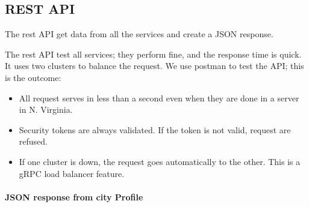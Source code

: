 \subsection{REST API}
\vskip 0.1in
\indent
\indent
The rest API get data from all the services and create a JSON response. 

The rest API test all services; they perform fine, and the response time is quick. It uses two clusters to balance the request.
We use postman to test the API; this is the outcome:

\begin{itemize}


	\item  All request serves in less than a second even when they are done in a server in N. Virginia.
	\item  Security tokens are always validated. If the token is not valid, request are refused.
	\item  If one cluster is down, the request goes automatically to the other. This is a gRPC load balancer feature.
\end{itemize}

\paragraph{JSON response from  city Profile}


